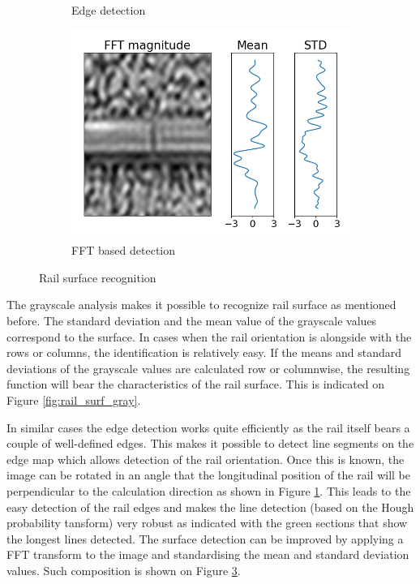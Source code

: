 \documentclass[10pt, final]{article}
\begin{document}
\begin{figure}[!ht]
\begin{subfigure}{0.3\textwidth}
		\caption{Edge detection}
		\label{fig:rail_surf_edge}
	\end{subfigure}
	\begin{subfigure}{0.3\textwidth}
		\centering
		\includegraphics[width=\textwidth]{./tex_graphs/rail_surf_fft.png}
		\caption{FFT based detection}
		\label{fig:rail_surf_fft}
	\end{subfigure}
	\caption{Rail surface recognition}
\end{figure}

The grayscale analysis makes it possible to recognize rail surface as mentioned before.
The standard deviation and the mean value of the grayscale values correspond to the surface.
In cases when the rail orientation is alongside with the rows or columns, the identification is relatively easy.
If the means and standard deviations of the grayscale values are calculated row or columnwise, the resulting function
will bear the characteristics of the rail surface.
This is indicated on Figure \ref{fig:rail_surf_gray}.

In similar cases the edge detection works quite efficiently as the rail itself bears a couple of well-defined edges.
This makes it possible to detect line segments on the edge map which allows detection of the rail orientation.
Once this is known, the image can be rotated in an angle that the longitudinal position of the rail will be
perpendicular to the calculation direction as shown in Figure \ref{fig:rail_surf_edge}.
This leads to the easy detection of the rail edges and makes the line detection (based on the Hough probability tansform)
very robust as indicated with the green sections that show the longest lines detected.
The surface detection can be improved by applying a FFT transform to the image and standardising the mean and
standard deviation values.
Such composition is shown on Figure \ref{fig:rail_surf_fft}.
\end{document}
